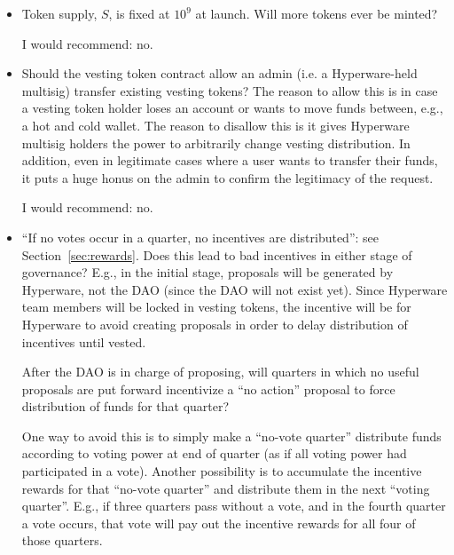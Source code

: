 \documentclass{article}
\begin{document}
\begin{itemize}
    \item Token supply, $S$, is fixed at $10^9$ at launch.
        Will more tokens ever be minted?

        I would recommend: no.
    \item Should the vesting token contract allow an admin (i.e. a Hyperware-held multisig) transfer existing vesting tokens?
        The reason to allow this is in case a vesting token holder loses an account or wants to move funds between, e.g., a hot and cold wallet.
        The reason to disallow this is it gives Hyperware multisig holders the power to arbitrarily change vesting distribution.
        In addition, even in legitimate cases where a user wants to transfer their funds, it puts a huge honus on the admin to confirm the legitimacy of the request.

        I would recommend: no.
    \item ``If no votes occur in a quarter, no incentives are distributed'': see Section~\ref{sec:rewards}.
        Does this lead to bad incentives in either stage of governance?
        E.g., in the initial stage, proposals will be generated by Hyperware, not the DAO (since the DAO will not exist yet).
        Since Hyperware team members will be locked in vesting tokens, the incentive will be for Hyperware to avoid creating proposals in order to delay distribution of incentives until vested.

        After the DAO is in charge of proposing, will quarters in which no useful proposals are put forward incentivize a ``no action'' proposal to force distribution of funds for that quarter?
        
        One way to avoid this is to simply make a ``no-vote quarter'' distribute funds according to voting power at end of quarter (as if all voting power had participated in a vote).
        Another possibility is to accumulate the incentive rewards for that ``no-vote quarter'' and distribute them in the next ``voting quarter''.
        E.g., if three quarters pass without a vote, and in the fourth quarter a vote occurs, that vote will pay out the incentive rewards for all four of those quarters.
\end{itemize}
\end{document}
